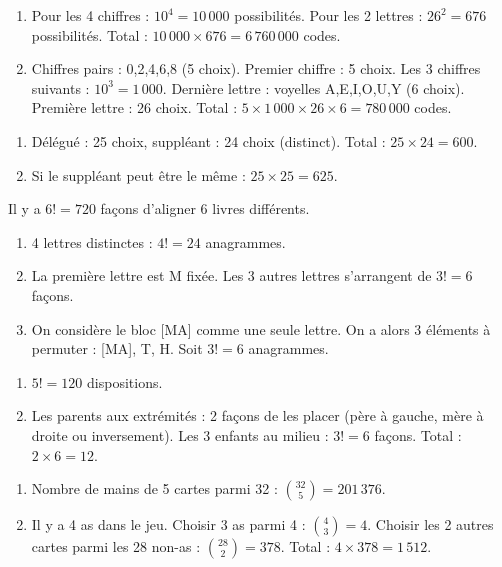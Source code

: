 \begin{enumerate}[label=\alph*)]
    \item Pour les 4 chiffres : $10^4 = 10\,000$ possibilités. Pour les 2 lettres : $26^2 = 676$ possibilités. Total : $10\,000 \times 676 = 6\,760\,000$ codes.
    \item Chiffres pairs : 0,2,4,6,8 (5 choix). Premier chiffre : 5 choix. Les 3 chiffres suivants : $10^3 = 1\,000$. Dernière lettre : voyelles A,E,I,O,U,Y (6 choix). Première lettre : 26 choix. Total : $5 \times 1\,000 \times 26 \times 6 = 780\,000$ codes.
\end{enumerate}

\begin{enumerate}[label=\alph*)]
    \item Délégué : 25 choix, suppléant : 24 choix (distinct). Total : $25 \times 24 = 600$.
    \item Si le suppléant peut être le même : $25 \times 25 = 625$.
\end{enumerate}

Il y a $6! = 720$ façons d'aligner 6 livres différents.

\begin{enumerate}[label=\alph*)]
    \item 4 lettres distinctes : $4! = 24$ anagrammes.
    \item La première lettre est M fixée. Les 3 autres lettres s'arrangent de $3! = 6$ façons.
    \item On considère le bloc [MA] comme une seule lettre. On a alors 3 éléments à permuter : [MA], T, H. Soit $3! = 6$ anagrammes.
\end{enumerate}

\begin{enumerate}[label=\alph*)]
    \item $5! = 120$ dispositions.
    \item Les parents aux extrémités : 2 façons de les placer (père à gauche, mère à droite ou inversement). Les 3 enfants au milieu : $3! = 6$ façons. Total : $2 \times 6 = 12$.
\end{enumerate}

\begin{enumerate}[label=\alph*)]
    \item Nombre de mains de 5 cartes parmi 32 : $\binom{32}{5} = 201\,376$.
    \item Il y a 4 as dans le jeu. Choisir 3 as parmi 4 : $\binom{4}{3}=4$. Choisir les 2 autres cartes parmi les 28 non-as : $\binom{28}{2}=378$. Total : $4 \times 378 = 1\,512$.
\end{enumerate}

